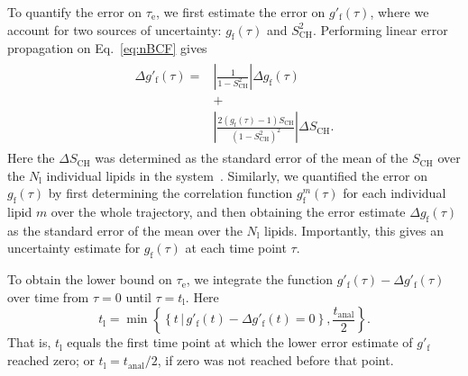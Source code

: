 \documentclass[journal=jcisd8,manuscript=article,layout=twocolumn]{achemso}
\begin{document}
To quantify the error on $\tau_\mathrm e$, we first estimate the error on $g'_\mathrm f(\tau)$,
where we account for two sources of uncertainty: $g_{\mathrm{f}}(\tau)$ and $S^2_\mathrm{CH}$.
%
Performing linear error propagation on Eq.~\eqref{eq:nBCF} gives
\begin{align}
\begin{split}
\label{eq:error}
\Delta g'_{\mathrm{f}}(\tau)
=
&\left|
	\frac{1}{1-S^2_\mathrm{CH}}
\right|
\Delta g_{\mathrm{f}}(\tau)\\
&+\\
&\left|
	\frac{2\left(g_\mathrm{f}(\tau)-1\right)S_\mathrm{CH}}{\left(1-S^2_\mathrm{CH}\right)^2}
\right|
\Delta S_\mathrm{CH}.
\end{split}
\end{align}
Here the $\Delta S_\mathrm{CH}$ was determined 
as the standard error of the mean of the $S_\mathrm{CH}$ over the $N_\mathrm l$ individual lipids in the system~\cite{botan15}.
%
Similarly, we quantified the error on $g_{\mathrm{f}}(\tau)$
by first determining the correlation function $g^m_{\mathrm{f}}(\tau)$ for each individual lipid $m$
over the whole trajectory, and then obtaining the error estimate
$\Delta g_{\mathrm{f}}(\tau)$
as the standard error of the mean over the $N_\mathrm l$ lipids.
%
Importantly, this gives an uncertainty estimate for $g_{\mathrm{f}}(\tau)$ at each time point $\tau$.

To obtain the lower bound on $\tau_\mathrm e$, we integrate the function
$g'_{\mathrm{f}}(\tau) - \Delta g'_{\mathrm{f}}(\tau)$ over time from $\tau=0$ until $\tau=t_\mathrm l$.
Here
\begin{equation}
t_\mathrm l= \min
\left\{
	\left\{
		t\,|\,g'_{\mathrm{f}}(t) - \Delta g'_{\mathrm{f}}(t) = 0
	\right\},
	\frac{t_\mathrm{anal}}{2}
\right\}.
\end{equation}
That is,
$t_\mathrm l$ equals
the first time point at which the lower error estimate of $g'_\mathrm f$ reached zero;
or $t_\mathrm l=t_\mathrm{anal}/2$, if zero was not reached before that point.
\end{document}
